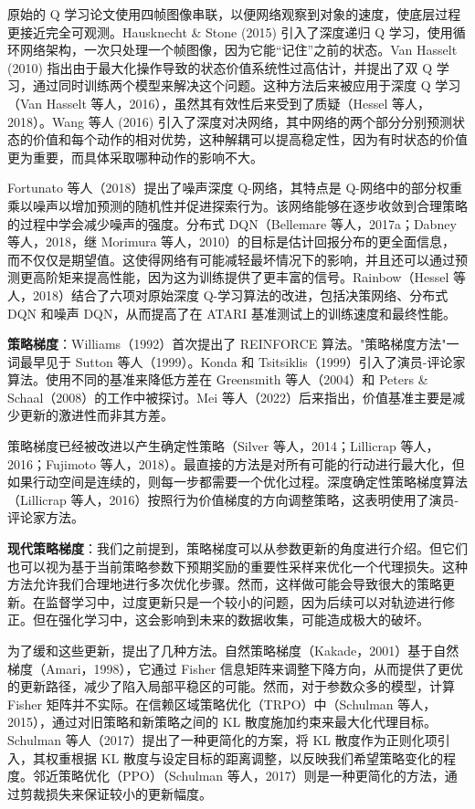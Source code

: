 原始的 Q 学习论文使用四帧图像串联，以便网络观察到对象的速度，使底层过程更接近完全可观测。Hausknecht \& Stone (2015) 引入了深度递归 Q 学习，使用循环网络架构，一次只处理一个帧图像，因为它能“记住”之前的状态。Van Hasselt (2010) 指出由于最大化操作导致的状态价值系统性过高估计，并提出了双 Q 学习，通过同时训练两个模型来解决这个问题。这种方法后来被应用于深度 Q 学习（Van Hasselt 等人，2016），虽然其有效性后来受到了质疑（Hessel 等人，2018）。Wang 等人 (2016) 引入了深度对决网络，其中网络的两个部分分别预测状态的价值和每个动作的相对优势，这种解耦可以提高稳定性，因为有时状态的价值更为重要，而具体采取哪种动作的影响不大。

Fortunato 等人（2018）提出了噪声深度 Q-网络，其特点是 Q-网络中的部分权重乘以噪声以增加预测的随机性并促进探索行为。该网络能够在逐步收敛到合理策略的过程中学会减少噪声的强度。分布式 DQN（Bellemare 等人，2017a；Dabney 等人，2018，继 Morimura 等人，2010）的目标是估计回报分布的更全面信息，而不仅仅是期望值。这使得网络有可能减轻最坏情况下的影响，并且还可以通过预测更高阶矩来提高性能，因为这为训练提供了更丰富的信号。Rainbow（Hessel 等人，2018）结合了六项对原始深度 Q-学习算法的改进，包括决策网络、分布式 DQN 和噪声 DQN，从而提高了在 ATARI 基准测试上的训练速度和最终性能。

\textbf{策略梯度}：Williams（1992）首次提出了 REINFORCE 算法。"策略梯度方法"一词最早见于 Sutton 等人（1999）。Konda 和 Tsitsiklis（1999）引入了演员-评论家算法。使用不同的基准来降低方差在 Greensmith 等人（2004）和 Peters \& Schaal（2008）的工作中被探讨。Mei 等人（2022）后来指出，价值基准主要是减少更新的激进性而非其方差。

策略梯度已经被改进以产生确定性策略（Silver 等人，2014；Lillicrap 等人，2016；Fujimoto 等人，2018）。最直接的方法是对所有可能的行动进行最大化，但如果行动空间是连续的，则每一步都需要一个优化过程。深度确定性策略梯度算法（Lillicrap 等人，2016）按照行为价值梯度的方向调整策略，这表明使用了演员-评论家方法。

\textbf{现代策略梯度}：我们之前提到，策略梯度可以从参数更新的角度进行介绍。但它们也可以视为基于当前策略参数下预期奖励的重要性采样来优化一个代理损失。这种方法允许我们合理地进行多次优化步骤。然而，这样做可能会导致很大的策略更新。在监督学习中，过度更新只是一个较小的问题，因为后续可以对轨迹进行修正。但在强化学习中，这会影响到未来的数据收集，可能造成极大的破坏。

为了缓和这些更新，提出了几种方法。自然策略梯度（Kakade，2001）基于自然梯度（Amari，1998），它通过 Fisher 信息矩阵来调整下降方向，从而提供了更优的更新路径，减少了陷入局部平稳区的可能。然而，对于参数众多的模型，计算 Fisher 矩阵并不实际。在信赖区域策略优化（TRPO）中（Schulman 等人，2015），通过对旧策略和新策略之间的 KL 散度施加约束来最大化代理目标。Schulman 等人（2017）提出了一种更简化的方案，将 KL 散度作为正则化项引入，其权重根据 KL 散度与设定目标的距离调整，以反映我们希望策略变化的程度。邻近策略优化（PPO）（Schulman 等人，2017）则是一种更简化的方法，通过剪裁损失来保证较小的更新幅度。

